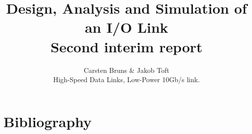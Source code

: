 \documentclass[12pt,journal,compsoc,onecolumn]{IEEEtran}
\begin{document}
%
\title{Design, Analysis and Simulation of an I/O Link\\Second interim report}

\author{Carsten Bruns
        \& Jakob Toft%



\begin{IEEEkeywords}
High-Speed Data Links, Low-Power 10Gb/s link.
\end{IEEEkeywords}}


\maketitle

\IEEEdisplaynotcompsoctitleabstractindextext
\IEEEpeerreviewmaketitle





%
%




%




\ifCLASSOPTIONcaptionsoff
  \newpage
\fi

\newpage
\section{Bibliography}
{}

\end{document}
